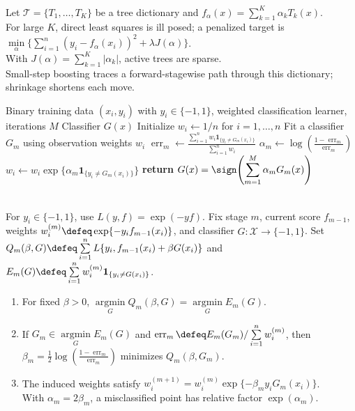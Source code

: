 \begin{remark} \label{rem:sl-stagewise-lasso-regularization-path} \\
Let $\mathcal T=\{T_1,\ldots,T_K\}$ be a tree dictionary and $f_\alpha(x)=\sum\limits_{k=1}^K\alpha_kT_k(x)$.\\
For large $K$, direct least squares is ill posed; a penalized target is $\min\limits_\alpha\{\sum\limits_{i=1}^n(y_i-f_\alpha(x_i))^2+\lambda J(\alpha)\}$.\\
With $J(\alpha)=\sum\limits_{k=1}^K|\alpha_k|$, active trees are sparse.\\
Small-step boosting traces a forward-stagewise path through this dictionary; shrinkage shortens each move.
\end{remark}

\begin{breakablealgorithm}
\caption{AdaBoost.M1}
\label{alg:sl-adaboost-m1}
\begin{algorithmic}
\Require Binary training data $(x_i,y_i)$ with $y_i\in\{-1,1\}$, weighted classification learner, iterations $M$
\Ensure Classifier $G(x)$
\State Initialize $w_i\gets 1/n$ for $i=1,\ldots,n$
\State Fit a classifier $G_m$ using observation weights $w_i$
\State $\displaystyle \operatorname{err}_m\gets
\frac{\sum_{i=1}^n w_i\mathbf{1}_{\{y_i\neq G_m(x_i)\}}}{\sum_{i=1}^n w_i}$
\State $\displaystyle \alpha_m\gets \log\!\left(\frac{1-\operatorname{err}_m}{\operatorname{err}_m}\right)$
\State $w_i\gets w_i\exp\{\alpha_m\mathbf{1}_{\{y_i\neq G_m(x_i)\}}\}$
\EndFor
\EndFor
\State \textbf{return} $\displaystyle G(x)=\sign\!\left(\sum_{m=1}^M\alpha_mG_m(x)\right)$
\end{algorithmic}
\end{breakablealgorithm}

\begin{proposition} \label{prop:sl-adaboost-exponential-stagewise} \\
For $y_i\in\{-1,1\}$, use $L(y,f)=\exp(-yf)$.  Fix stage $m$, current score $f_{m-1}$, weights $w_i^{(m)}\defeq\exp\{-y_if_{m-1}(x_i)\}$, and classifier $G:\mathcal X\to\{-1,1\}$.  Set $Q_m(\beta,G)\defeq\sum\limits_{i=1}^n L\{y_i,f_{m-1}(x_i)+\beta G(x_i)\}$ and $E_m(G)\defeq\sum\limits_{i=1}^n w_i^{(m)}\mathbf{1}_{\{y_i\neq G(x_i)\}}$.
\begin{enumerate}[label=(\roman*)]
\setlength{\itemsep}{0pt}
\item For fixed $\beta>0$, $\operatorname*{argmin}\limits_G Q_m(\beta,G)=\operatorname*{argmin}\limits_G E_m(G)$.
\item If $G_m\in\operatorname*{argmin}\limits_G E_m(G)$ and $\operatorname{err}_m\defeq E_m(G_m)/\sum\limits_{i=1}^n w_i^{(m)}$, then $\beta_m=\frac12\log\!\left(\frac{1-\operatorname{err}_m}{\operatorname{err}_m}\right)$ minimizes $Q_m(\beta,G_m)$.
\item The induced weights satisfy $w_i^{(m+1)}=w_i^{(m)}\exp\{-\beta_my_iG_m(x_i)\}$.\\
With $\alpha_m=2\beta_m$, a misclassified point has relative factor $\exp(\alpha_m)$.
\end{enumerate}
\end{proposition}

